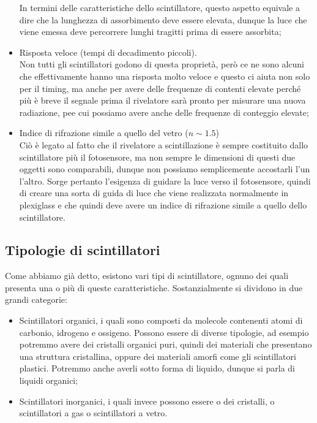 \begin{itemize}[leftmargin=0.5cm]
   In termini delle caratteristiche dello scintillatore, questo aspetto equivale a dire che la lunghezza di assorbimento deve essere elevata, dunque la luce che viene emessa deve percorrere lunghi tragitti prima di essere assorbita;
   \item Risposta veloce (tempi di decadimento piccoli).\\
   Non tutti gli scintillatori godono di questa proprietà, però ce ne sono alcuni che effettivamente hanno una risposta molto veloce e questo ci aiuta non solo per il timing, ma anche per avere delle frequenze di contenti elevate perché più è breve il segnale prima il rivelatore sarà pronto per misurare una nuova radiazione, pee cui possiamo avere anche delle frequenze di conteggio elevate;
   \item Indice di rifrazione simile a quello del vetro ($n \sim 1.5$)\\
   Ciò è legato al fatto che il rivelatore a scintillazione è sempre costituito dallo scintillatore più il fotosensore, ma non sempre le dimensioni di questi due oggetti sono comparabili, dunque non possiamo semplicemente accostarli l'un l'altro. Sorge pertanto l'esigenza di guidare la luce verso il fotosensore, quindi di creare una sorta di guida di luce che viene realizzata normalmente in plexiglass e che quindi deve avere un indice di rifrazione simile a quello dello scintillatore.
\end{itemize}

\subsection{Tipologie di scintillatori}

Come abbiamo già detto, esistono vari tipi di scintillatore, ognuno dei quali presenta una o più di queste caratteristiche. Sostanzialmente si dividono in due grandi categorie:
\begin{itemize}[leftmargin=0.5cm]
   \item Scintillatori organici, i quali sono composti da molecole contenenti atomi di carbonio, idrogeno e ossigeno. Possono essere di diverse tipologie, ad esempio potremmo avere dei cristalli organici puri, quindi dei materiali che presentano una struttura cristallina, oppure dei materiali amorfi come gli scintillatori plastici. Potremmo anche averli sotto forma di liquido, dunque si parla di liquidi organici;
   \item Scintillatori inorganici, i quali invece possono essere o dei cristalli, o scintillatori a gas o scintillatori a vetro.
\end{itemize}


